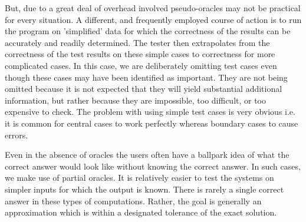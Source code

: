 But, due to a great deal of overhead involved pseudo-oracles may not be practical for every situation.  
A different, and frequently employed course of action is to run the program on 'simplified' data for which the correctness of the results can be accurately and readily determined. The tester then extrapolates from the correctness of the test results on these simple cases to correctness for more complicated cases. In this case, we are deliberately omitting test cases even though these cases may have been identified as important. They are not being omitted because it is not expected that they will yield substantial additional information, but rather because they are impossible, too difficult, or too expensive to check. The problem with using simple test cases is very obvious i.e. it is common for central cases to work perfectly whereas boundary cases to cause errors. \cite{Weyuker}

Even in the absence of oracles the users often have a ballpark idea of what the correct answer would look like without knowing the correct answer. In such cases, we make use of partial oracles. It is relatively easier to test the systems on simpler inputs for which the output is known. There is rarely a single correct answer in these types of computations. Rather, the goal is generally an approximation which is within a designated tolerance of the exact solution. 